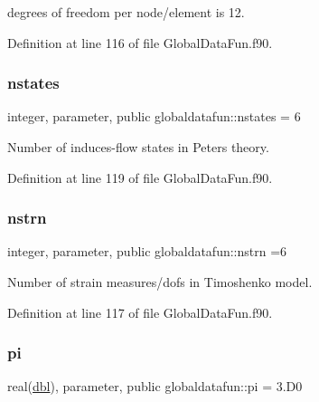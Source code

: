 degrees of freedom per node/element is 12. 



Definition at line 116 of file Global\+Data\+Fun.\+f90.

\mbox{\label{namespaceglobaldatafun_a2c33dd8d5d818282893dd132f6b33564}} 
\subsubsection{\texorpdfstring{nstates}{nstates}}
{\footnotesize\ttfamily integer, parameter, public globaldatafun\+::nstates = 6}



Number of induces-\/flow states in Peters theory. 



Definition at line 119 of file Global\+Data\+Fun.\+f90.

\mbox{\label{namespaceglobaldatafun_a3aff613607f0e62fc5c5739e9f2432e9}} 
\subsubsection{\texorpdfstring{nstrn}{nstrn}}
{\footnotesize\ttfamily integer, parameter, public globaldatafun\+::nstrn =6}



Number of strain measures/dofs in Timoshenko model. 



Definition at line 117 of file Global\+Data\+Fun.\+f90.

\mbox{\label{namespaceglobaldatafun_a05144a47841796a672385a1db57f91a1}} 
\subsubsection{\texorpdfstring{pi}{pi}}
{\footnotesize\ttfamily real(\hyperlink{namespaceglobaldatafun_a5008801201dd34f2af8eae07756befb4}{dbl}), parameter, public globaldatafun\+::pi = 3.\+D0}



